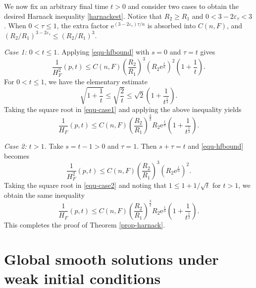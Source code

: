 \documentclass[11pt,reqno]{amsart}
\theoremstyle{definition}
\theoremstyle{remark}
\numberwithin{equation}{section}
\begin{document}
		
		We now fix an arbitrary final time $t>0$ and consider two cases to obtain the desired Harnack inequality \eqref{harnackest}. Notice that $R_2\geq R_1$ and $0<3-2\varepsilon_\tau<3$. When $0<\tau\leq1$, the extra factor $\mathrm e^{(3-2\varepsilon_\tau)\tau/n}$ is absorbed into $C(n,F)$, and $(R_2/R_1)^{3-2\varepsilon_\tau}\leq(R_2/R_1)^3$.
		
		\textit{Case 1: $0<t\leq 1$.} Applying \eqref{equ-hfbound} with $s=0$ and $\tau=t$ gives
		\begin{equation}
			\dfrac{1}{H_F^2}(p,t)\leq C(n,F)\left(\dfrac{R_2}{R_1}\right)^{3}\left( R_2 \mathrm{e}^{\frac{t}{n}} \right)^2 \left( 1+\dfrac{1}{t} \right).
			\label{equ-case1}
		\end{equation}
		For $0 < t \leq 1$, we have the elementary estimate
		\begin{equation*}
			\sqrt{1+ \dfrac{1}{t}} \leq \sqrt{\dfrac{2}{t}} \leq \sqrt{2}\left( 1 + \dfrac{1}{t^{\frac{1}{2}}} \right).
		\end{equation*}
		Taking the square root in \eqref{equ-case1} and applying the above inequality yields
		\begin{equation*}
			\frac{1}{H_F}(p,t)\leq C(n,F)\left(\frac{R_2}{R_1}\right)^{\frac{3}{2}} R_2\mathrm{e}^{\frac{t}{n}}\left(1+\frac{1}{t^{\frac{1}{2}}}\right).
		\end{equation*}
		
		\textit{Case 2: $t>1$.} Take $s=t-1>0$ and $\tau=1$. Then $s+\tau=t$ and \eqref{equ-hfbound} becomes
		\begin{equation}
			\dfrac{1}{H_F^2}(p,t)\leq C(n,F)\left(\dfrac{R_2}{R_1}\right)^{3}\left( R_2 \mathrm{e}^{\frac{t}{n}} \right)^2.
			\label{equ-case2}
		\end{equation}
		Taking the square root in \eqref{equ-case2} and noting that $1 \leq 1 + 1/\sqrt{t}$ for $t > 1$, we obtain the same inequality
		\begin{equation*}
			\frac{1}{H_F}(p,t)\leq C(n,F)\left(\frac{R_2}{R_1}\right)^{\frac{3}{2}} R_2\mathrm{e}^{\frac{t}{n}}\left(1+\frac{1}{t^{\frac{1}{2}}}\right).
		\end{equation*}
		This completes the proof of Theorem \ref{prop-harnack}.

	
	
	\section{Global smooth solutions under weak initial conditions}
	\label{sec4}
	
\end{document}
